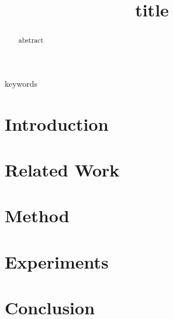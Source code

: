 \documentclass[conference]{IEEEtran}
\begin{document}
\title{{{title}}}

\author{
}

\maketitle

\begin{abstract}
{{abstract}}
\end{abstract}

\begin{IEEEkeywords}
{{keywords}}
\end{IEEEkeywords}

\section{Introduction}
\section{Related Work}
\section{Method}
\section{Experiments}
\section{Conclusion}



\end{document}
